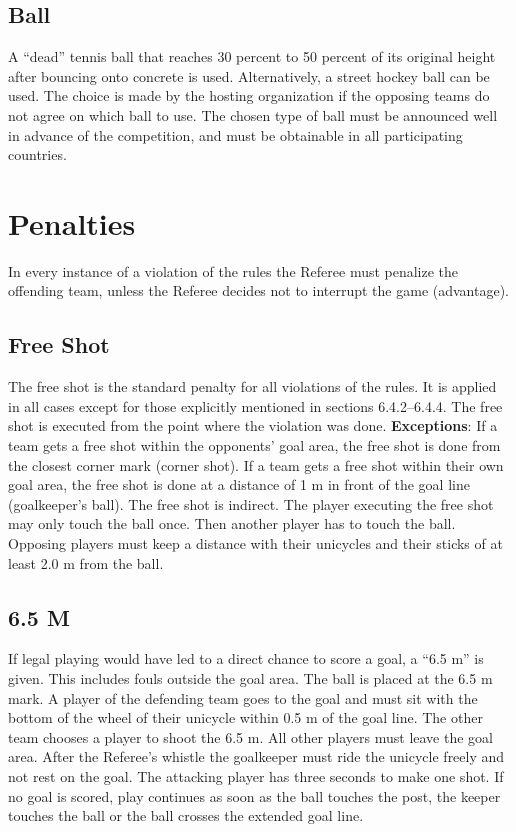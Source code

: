\subsection{Ball}
A “dead” tennis ball that reaches 30 percent to 50 percent of its original height after bouncing onto concrete is used.
Alternatively, a street hockey ball can be used. The choice is made by the hosting organization if the opposing teams
do not agree on which ball to use. The chosen type of ball must be announced well in advance of the competition, and
must be obtainable in all participating countries.

\section{Penalties}
In every instance of a violation of the rules the Referee must penalize the offending team, unless the Referee decides not to
interrupt the game (advantage).

\subsection{Free Shot}
The free shot is the standard penalty for all violations of the rules. It is applied in all cases except for those explicitly
mentioned in sections 6.4.2–6.4.4. The free shot is executed from the point where the violation was done. \textbf{Exceptions}:
If a team gets a free shot within the opponents’ goal area, the free shot is done from the closest corner mark (corner
shot). If a team gets a free shot within their own goal area, the free shot is done at a distance of 1 m in front of the goal
line (goalkeeper's ball). The free shot is indirect. The player executing the free shot may only touch the ball once. Then
another player has to touch the ball. Opposing players must keep a distance with their unicycles and their sticks of at
least 2.0 m from the ball.

\subsection{6.5 M}
If legal playing would have led to a direct chance to score a goal, a “6.5 m” is given. This includes fouls outside the
goal area. The ball is placed at the 6.5 m mark. A player of the defending team goes to the goal and must sit with the
bottom of the wheel of their unicycle within 0.5 m of the goal line. The other team chooses a player to shoot the 6.5 m.
All other players must leave the goal area. After the Referee’s whistle the goalkeeper must ride the unicycle freely and
not rest on the goal. The attacking player has three seconds to make one shot. If no goal is scored, play continues as
soon as the ball touches the post, the keeper touches the ball or the ball crosses the extended goal line.

